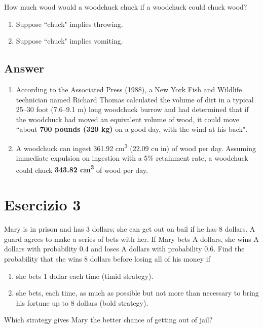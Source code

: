 \documentclass[
	12pt, %
]{fphw}
\begin{document}
\begin{problem}
	How much wood would a woodchuck chuck if a woodchuck could chuck wood?
	
	\medskip
	
	\begin{enumerate} %
		\item Suppose ``chuck" implies throwing.
		\item Suppose ``chuck" implies vomiting.
	\end{enumerate}
\end{problem}


\subsection*{Answer}

\begin{enumerate} %
	\item According to the Associated Press (1988), a New York Fish and Wildlife technician named Richard Thomas calculated the volume of dirt in a typical 25--30 foot (7.6--9.1 m) long woodchuck burrow and had determined that if the woodchuck had moved an equivalent volume of wood, it could move ``about \textbf{700 pounds (320 kg)} on a good day, with the wind at his back".
    
	\item A woodchuck can ingest 361.92 cm\textsuperscript{3} (22.09 cu in) of wood per day. Assuming immediate expulsion on ingestion with a 5\% retainment rate, a woodchuck could chuck \textbf{343.82 cm\textsuperscript{3}} of wood per day.
\end{enumerate}


\section*{Esercizio 3}

\begin{problem}
	\smallskip
	Mary is in prison and has 3 dollars; she can get out on bail if he
	has 8 dollars. A guard agrees to make a series of bets with her.
	If Mary bets A dollars, she wins A dollars with probability 0.4 and loses A dollars with probability 0.6.
	Find the probability that she wins 8 dollars before losing all of his money if
	\medskip
	\begin{enumerate}
		\item she bets 1 dollar each time (timid strategy).
		\item she bets, each time, as much as possible but not more than necessary to bring his fortune up to 8 dollars (bold strategy).
	\end{enumerate}
	\smallskip
	Which strategy gives Mary the better chance of getting out of jail?
	\smallskip
\end{problem}
\end{document}
